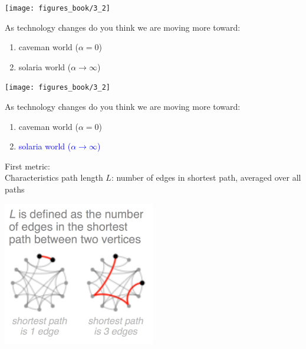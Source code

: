 \documentclass[aspectratio=169]{beamer}
\begin{document}
\begin{frame}

\begin{center}
\texttt{[image: figures\_book/3\_2]}
\end{center}

As technology changes do you think we are moving more toward:
\begin{enumerate}
\item caveman world ($\alpha = 0$)
\item solaria world ($\alpha \rightarrow \infty$)
\end{enumerate}

\end{frame}
\begin{frame}

\begin{center}
\texttt{[image: figures\_book/3\_2]}
\end{center}

As technology changes do you think we are moving more toward:
\begin{enumerate}
\item caveman world ($\alpha = 0$)
\item \textcolor{blue}{solaria world ($\alpha \rightarrow \infty$)}
\end{enumerate}

\end{frame}
\begin{frame}

First metric:\\
Characteristics path length $L$: number of edges in shortest path, averaged over all paths\\

\begin{center}
\includegraphics[width = 0.5\textwidth]{figures/victor_2011_L}
\end{center}


\end{frame}
\end{document}
